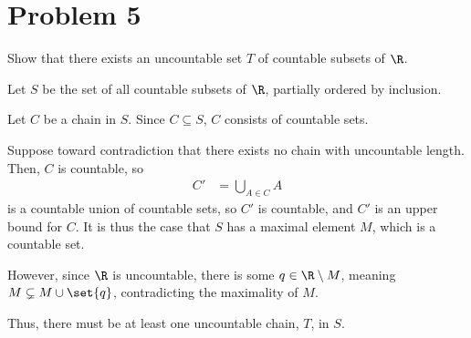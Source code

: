 \documentclass[10pt]{mypackage}
\begin{document}
\section{Problem 5}%
\begin{problem}
  Show that there exists an uncountable set $T$ of countable subsets of $\R$.
\end{problem}
\begin{solution}
  Let $S$ be the set of all countable subsets of $\R$, partially ordered by inclusion.\newline

  Let $C$ be a chain in $S$. Since $C\subseteq S$, $C$ consists of countable sets.\newline

  Suppose toward contradiction that there exists no chain with uncountable length. Then, $C$ is countable, so
  \begin{align*}
    C' &= \bigcup_{A\in C}A
  \end{align*}
  is a countable union of countable sets, so $C'$ is countable, and $C'$ is an upper bound for $C$. It is thus the case that $S$ has a maximal element $M$, which is a countable set.\newline

  However, since $\R$ is uncountable, there is some $q\in \R\setminus M$, meaning $M\subsetneq M\cup \set{q}$, contradicting the maximality of $M$.\newline

  Thus, there must be at least one uncountable chain, $T$, in $S$.
\end{solution}
\end{document}
